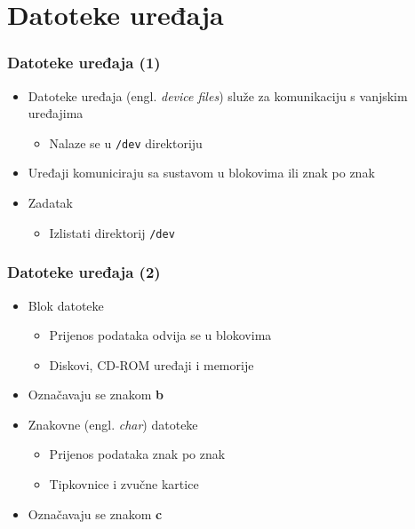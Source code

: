 \documentclass{beamer}
\newcommand{\shell}[1]{\texttt{#1}}
\begin{document}
\section{Datoteke uređaja}
\begin{frame}[t]
\frametitle{Datoteke uređaja (1)}
\begin{itemize}
  \item Datoteke uređaja (engl. \emph{device files}) služe za komunikaciju
        s vanjskim uređajima 
  \begin{itemize}
    \item Nalaze se u \shell{/dev} direktoriju
  \end{itemize}
  \item Uređaji komuniciraju sa sustavom u blokovima ili znak po znak
  \item Zadatak
  \begin{itemize}
    \item Izlistati direktorij \shell{/dev} 
  \end{itemize}
\end{itemize}
\end{frame}

\begin{frame}[t]
\frametitle{Datoteke uređaja (2)}
\begin{itemize}
  \item Blok datoteke
  \begin{itemize}
    \item Prijenos podataka odvija se u blokovima 
    \item Diskovi, CD-ROM uređaji i memorije
  \end{itemize}
  \item Označavaju se znakom \textbf{b}
  \item Znakovne (engl. \emph{char}) datoteke
  \begin{itemize}
    \item Prijenos podataka znak po znak
    \item Tipkovnice i zvučne kartice
  \end{itemize}
  \item Označavaju se znakom \textbf{c}
\end{itemize}
\end{frame}
\end{document}
